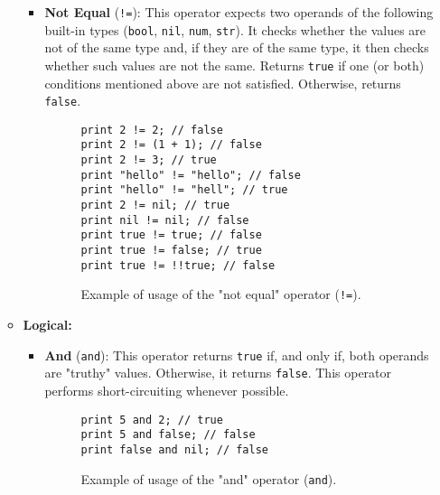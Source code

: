 \begin{itemize}
\begin{itemize}
\begin{itemize}
                    
                    \item \textbf{Not Equal} (\texttt{!=}): This operator expects two operands of the following built-in types (\texttt{bool}, \texttt{nil}, \texttt{num}, \texttt{str}). It checks whether the values are not of the same type and, if they are of the same type, it then checks whether such values are not the same. Returns \texttt{true} if one (or both) conditions mentioned above are not satisfied. Otherwise, returns \texttt{false}.
                    \begin{figure}[H]
                        \centering
                        \begin{lstlisting}
print 2 != 2; // false
print 2 != (1 + 1); // false
print 2 != 3; // true
print "hello" != "hello"; // false
print "hello" != "hell"; // true
print 2 != nil; // true
print nil != nil; // false
print true != true; // false
print true != false; // true
print true != !!true; // false
                        \end{lstlisting}
                        \caption{Example of usage of the "not equal" operator (\texttt{!=}).}
                    \end{figure}
                \end{itemize}
                
            \item \textbf{Logical:}
                \begin{itemize}
                    \item \textbf{And} (\texttt{and}): This operator returns \texttt{true} if, and only if, both operands are "truthy" values. Otherwise, it returns \texttt{false}. This operator performs short-circuiting whenever possible.
                    \begin{figure}[H]
                        \centering
                        \begin{lstlisting}
print 5 and 2; // true
print 5 and false; // false
print false and nil; // false
                        \end{lstlisting}
                        \caption{Example of usage of the "and" operator (\texttt{and}).}
                    \end{figure}
                    

\end{itemize}
\end{itemize}
\end{itemize}
